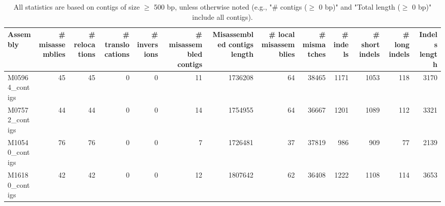 \documentclass[12pt,a4paper]{article}
\begin{document}
\begin{table}[ht]
\begin{center}
\caption{All statistics are based on contigs of size $\geq$ 500 bp, unless otherwise noted (e.g., "\# contigs ($\geq$ 0 bp)" and "Total length ($\geq$ 0 bp)" include all contigs).}
\begin{tabular}{|l*{12}{|r}|}
\hline
Assembly & \# misassemblies &     \# relocations &     \# translocations &     \# inversions & \# misassembled contigs & Misassembled contigs length & \# local misassemblies & \# mismatches & \# indels &     \# short indels &     \# long indels & Indels length \\ \hline
M05964\_contigs & 45 & 45 & 0 & 0 & 11 & 1736208 & 64 & 38465 & 1171 & 1053 & 118 & 3170 \\ \hline
M07572\_contigs & 44 & 44 & 0 & 0 & 14 & 1754955 & 64 & 36667 & 1201 & 1089 & 112 & 3321 \\ \hline
M10540\_contigs & 76 & 76 & 0 & 0 & 7 & 1726481 & 37 & 37819 & 986 & 909 & 77 & 2139 \\ \hline
M16180\_contigs & 42 & 42 & 0 & 0 & 12 & 1807642 & 62 & 36408 & 1222 & 1108 & 114 & 3653 \\ \hline
\end{tabular}
\end{center}
\end{table}
\end{document}
